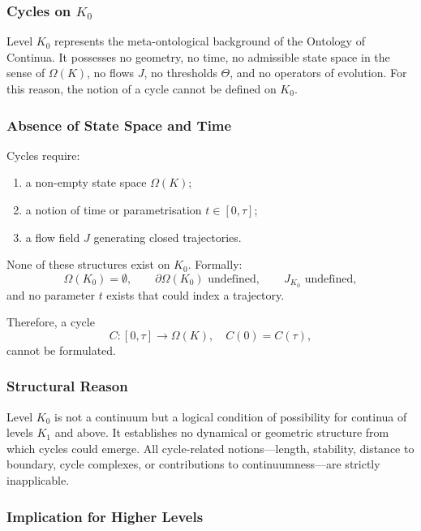 
\subsubsection{Cycles on \texorpdfstring{$K_0$}{K_0}}
\label{sec:cycles-k0}

Level $K_0$ represents the meta-ontological background of the
Ontology of Continua.  
It possesses no geometry, no time, no admissible state space in the
sense of $\Omega(K)$, no flows $J$, no thresholds $\Theta$, and no
operators of evolution.  
For this reason, the notion of a cycle cannot be defined on $K_0$.

\subsubsection{Absence of State Space and Time}

Cycles require:
\begin{enumerate}
  \item a non-empty state space $\Omega(K)$;
  \item a notion of time or parametrisation $t\in[0,\tau]$;
  \item a flow field $J$ generating closed trajectories.
\end{enumerate}

None of these structures exist on $K_0$.
Formally:
\[
  \Omega(K_0)=\emptyset, \qquad
  \partial\Omega(K_0) \text{ undefined}, \qquad
  J_{K_0} \text{ undefined},
\]
and no parameter $t$ exists that could index a trajectory.

Therefore, a cycle
\[
  C:[0,\tau]\to\Omega(K), \quad C(0)=C(\tau),
\]
cannot be formulated.

\subsubsection{Structural Reason}

Level $K_0$ is not a continuum but a logical condition of possibility
for continua of levels $K_1$ and above.
It establishes no dynamical or geometric structure from which cycles
could emerge.  
All cycle-related notions---length, stability, distance to boundary,
cycle complexes, or contributions to continuumness---are strictly
inapplicable.

\subsubsection{Implication for Higher Levels}

